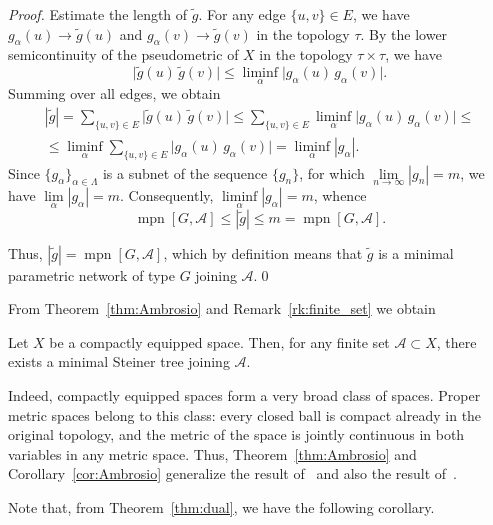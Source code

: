 \documentclass{svproc}
\def\mpn{\operatorname{mpn}}
\begin{document}
\begin{proof}
Estimate the length of $\widetilde{g}$. For any edge $\{u, v\}\in E$, we have $g_{\alpha}(u)\rightarrow \widetilde{g}(u)$ and $g_{\alpha}(v)\rightarrow \widetilde{g}(v)$ in the topology $\tau$. By the lower semicontinuity of the pseudometric of $X$ in the topology $\tau\times \tau$, we have
$$
\bigl|\widetilde{g}(u)\, \widetilde{g}(v)\bigr| \le \liminf_{\alpha} \bigl|g_{\alpha}(u)\, g_{\alpha}(v)\bigr|.
$$
Summing over all edges, we obtain
\begin{multline*}
|\widetilde{g}| = \sum_{\{u, v\}\in E} \bigl|\widetilde{g}(u)\, \widetilde{g}(v)\bigr| \le \sum_{\{u, v\}\in E} \liminf_{\alpha} \bigl|g_{\alpha}(u)\, g_{\alpha}(v)\bigr| \le \\ \le \liminf_{\alpha} \sum_{\{u, v\}\in E} \bigl|g_{\alpha}(u)\, g_{\alpha}(v)\bigr| = \liminf_{\alpha} |g_{\alpha}|.
\end{multline*}
Since $\bigl\{g_{\alpha}\bigr\}_{\alpha\in \Lambda}$ is a subnet of the sequence $\{g_n\}$, for which $\lim\limits_{n\rightarrow \infty} |g_n| = m$, we have $\lim\limits_{\alpha} |g_{\alpha}| = m$. Consequently, $\liminf\limits_{\alpha} |g_{\alpha}| = m$, whence
$$
\mpn[G, \mathcal{A}]\le |\widetilde{g}| \le m = \mpn[G, \mathcal{A}].
$$

Thus, $|\widetilde{g}| = \mpn[G, \mathcal{A}]$, which by definition means that $\widetilde{g}$ is a minimal parametric network of type $G$ joining $\mathcal{A}$.\qed

\end{proof}

From Theorem~\ref{thm:Ambrosio} and Remark~\ref{rk:finite_set} we obtain

\begin{corollary}\label{cor:Ambrosio}
Let $X$ be a compactly equipped space. Then, for any finite set $\mathcal{A}\subset X$, there exists a minimal Steiner tree joining $\mathcal{A}$.
\end{corollary}

Indeed, compactly equipped spaces form a very broad class of spaces. Proper metric spaces belong to this class: every closed ball is compact already in the original topology, and the metric of the space is jointly continuous in both variables in any metric space. Thus, Theorem~\ref{thm:Ambrosio} and Corollary~\ref{cor:Ambrosio} generalize the result of~\cite[Theorem~1]{Tropin} and also the result of~\cite[Chapter~2, Paragraph~2, Section~2.1, Theorem~2.1]{IT}.

Note that, from Theorem~\ref{thm:dual}, we have the following corollary.
\end{document}
